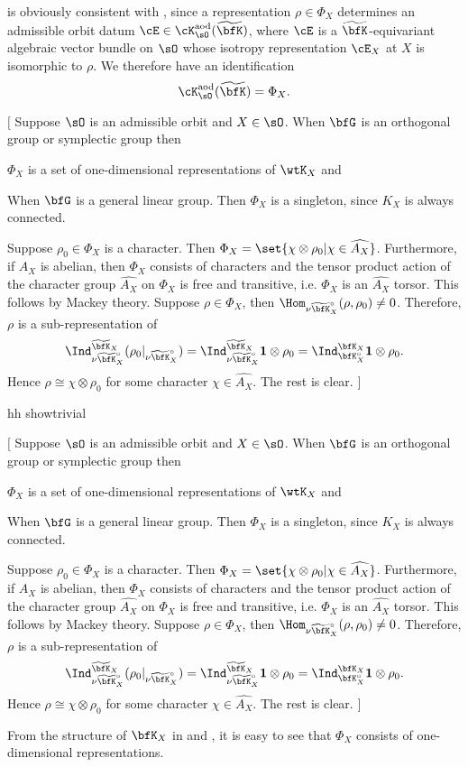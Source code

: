 \documentclass[12pt,a4paper]{amsart}
\newcommand{\trivial}[2][]{\if\relax\detokenize{#1}\relax
  {%
      \color{orange} \vspace{0em} $[$  #2 $]$
      \color{black}
  }
  \else
\ifx#1h
\ifcsname showtrivial\endcsname
{%
    \color{orange} \vspace{0em}  $[$ #2 $]$
    \color{black}
}
\fi
\else {\red Wrong argument!} \fi
\fi
}
\newcommand{\bfone}{\mathbf{1}}
\numberwithin{equation}{section}
\newtheorem{obs}[thm]{Observation}
\theoremstyle{remark}
\def\wtbfK{\widetilde{\bfK}}
\def\cKaod{\cK^{\mathrm{aod}}}
\def\bbfK{\wtbfK}
\def\whAX{\widehat{A_X}}
\begin{document}
 is obviously consistent with , since a
representation $\rho\in \Phi_X$ determines an admissible orbit datum
$\cE\in \cKaod_\sO(\wtbfK)$, where $\cE$ is a $\bbfK$-equivariant algebraic
vector bundle on $\sO$ whose isotropy representation $\cE_X$ at $X$ is
isomorphic to $\rho$.  We therefore have an identification
\begin{equation}\label{idenip}
  \cKaod_\sO(\wtbfK)=\Phi_X.
\end{equation}
\trivial[h]{
  Suppose $\sO$ is an admissible orbit and $X\in \sO$.
  When $\bfG$ is an orthogonal group or symplectic group then
  \begin{enumT}
  \item $\Phi_X$ is a set of one-dimensional representations of $\wtK_X$ and
  \item
  \end{enumT}
  When $\bfG$ is a general linear group. Then $\Phi_X$ is a singleton, since $K_X$
  is always connected.

  Suppose $\rho_0 \in \Phi_X$ is a character. Then $\Phi_X = \set{\chi \otimes \rho_0|\chi\in
    \whAX}$. Furthermore, if $A_X$
  is abelian, then $\Phi_X$ consists of
  characters and the tensor product action of the character
  group $\whAX$ on $\Phi_X$ is free and transitive, i.e. $\Phi_X$ is an $\whAX$
  torsor.
  This follows by Mackey theory. Suppose $\rho\in \Phi_X$, then
  $\Hom_{\nu \bbfK_X^\circ}(\rho, \rho_0)\neq 0$.
  Therefore, $\rho$ is a sub-representation of
  \[
    \Ind_{\nu \bbfK_X^\circ}^{\bbfK_X}(\rho_0|_{\nu \bbfK_X^\circ}) = \Ind_{\nu \bbfK_X^\circ}^{\bbfK_X}
    \bfone \otimes \rho_0 = \Ind_{\bfK_X^\circ}^{\bfK_X} \bfone \otimes \rho_0.
  \]
  Hence $\rho \cong \chi \otimes \rho_0$ for some
  character  $\chi\in \widehat{A_X}$.
  The rest is clear.
}
From the structure of $\bfK_X$ in  and , it is
easy to see  that $\Phi_X$ consists of one-dimensional representations.
\medskip
\end{document}
